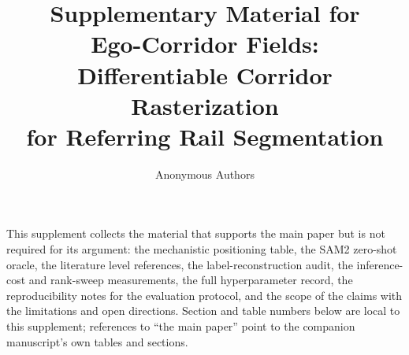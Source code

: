 \documentclass[journal,10pt]{IEEEtran}
\title{Supplementary Material for\\
Ego-Corridor Fields:\\
Differentiable Corridor Rasterization\\
for Referring Rail Segmentation}
\author{Anonymous Authors}
\date{}
\begin{document}
\maketitle

This supplement collects the material that supports the main paper but is not required
for its argument: the mechanistic positioning table, the SAM2 zero-shot oracle, the
literature level references, the label-reconstruction audit, the inference-cost and
rank-sweep measurements, the full hyperparameter record, the reproducibility notes
for the evaluation protocol, and the scope of the claims with the limitations and
open directions.
Section and table numbers below are local to this supplement; references to
``the main paper'' point to the companion manuscript's own tables and sections.

\appendix


\clearpage


\end{document}
